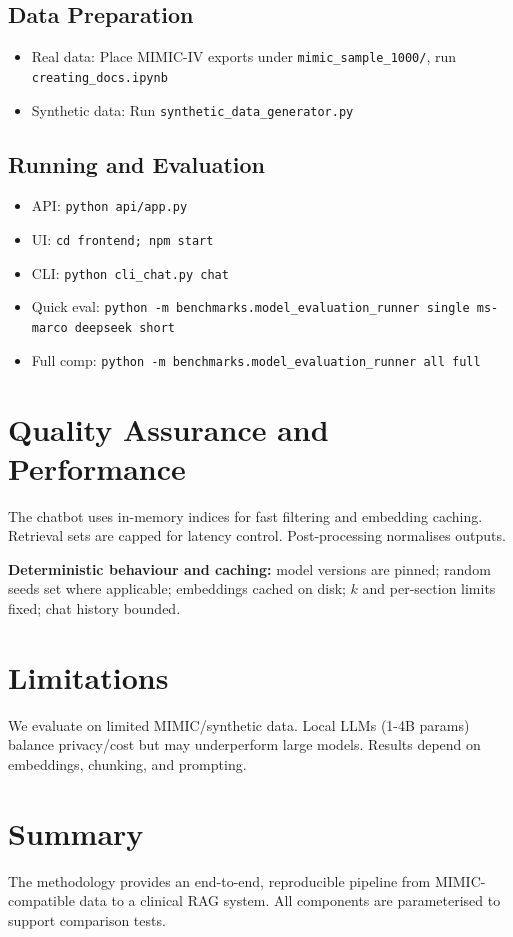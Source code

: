 \subsection{Data Preparation}
\begin{itemize}
  \item Real data: Place MIMIC-IV exports under \texttt{mimic\_sample\_1000/}, run \texttt{creating\_docs.ipynb}
  \item Synthetic data: Run \texttt{synthetic\_data\_generator.py}
\end{itemize}

\subsection{Running and Evaluation}
\begin{itemize}
  \item API: \texttt{python api/app.py}
  \item UI: \texttt{cd frontend; npm start}
  \item CLI: \texttt{python cli\_chat.py chat}
  \item Quick eval: \texttt{python -m benchmarks.model\_evaluation\_runner single ms-marco deepseek short}
  \item Full comp: \texttt{python -m benchmarks.model\_evaluation\_runner all full}
\end{itemize}

\section{Quality Assurance and Performance}
The chatbot uses in-memory indices for fast filtering and embedding caching. Retrieval sets are capped for latency control. Post-processing normalises outputs.

\noindent \textbf{Deterministic behaviour and caching:} model versions are pinned; random seeds set where applicable; embeddings cached on disk; \(k\) and per-section limits fixed; chat history bounded.

\section{Limitations}
We evaluate on limited MIMIC/synthetic data. Local LLMs (1-4B params) balance privacy/cost but may underperform large models. Results depend on embeddings, chunking, and prompting.

\section{Summary}
The methodology provides an end-to-end, reproducible pipeline from MIMIC-compatible data to a clinical RAG system. All components are parameterised to support comparison tests.
